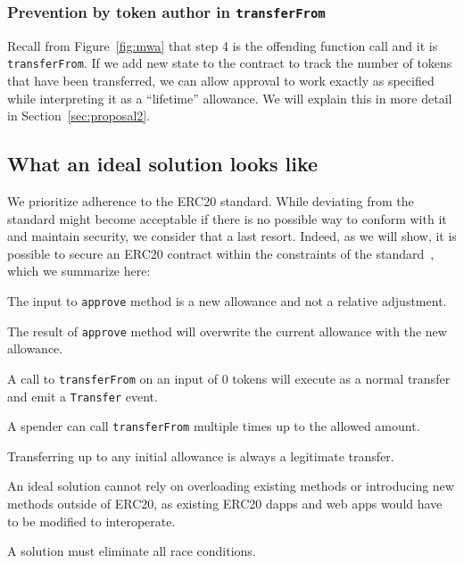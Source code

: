 \subsubsection*{Prevention by token author in \texttt{transferFrom}} Recall from Figure~\ref{fig:mwa} that step 4 is the offending function call and it is \texttt{transferFrom}. If we add new state to the contract to track the number of tokens that have been transferred, we can allow approval to work exactly as specified while interpreting it as a ``lifetime'' allowance. We will explain this in more detail in Section~\ref{sec:proposal2}. 

\subsection{What an ideal solution looks like}\label{sec:criteria}
We prioritize adherence to the ERC20 standard. While deviating from the standard might become acceptable if there is no possible way to conform with it and maintain security, we consider that a last resort. Indeed, as we will show, it is possible to secure an ERC20 contract within the constraints of the standard~\cite{Ref08}, which we summarize here:

\begin{compactlistn}
\item The input to \texttt{approve} method is a new allowance and not a relative adjustment.
\item The result of \texttt{approve} method will overwrite the current allowance with the new allowance.
\item A call to \texttt{transferFrom} on an input of 0 tokens will execute as a normal transfer and emit a \texttt{Transfer} event.
\item A spender can call \texttt{transferFrom} multiple times up to the allowed amount.
\item Transferring up to any initial allowance is always a legitimate transfer.
\item An ideal solution cannot rely on overloading existing methods or introducing new methods outside of ERC20, as existing ERC20 dapps and web apps would have to be modified to interoperate.
\item A solution must eliminate all race conditions.
\end{compactlistn}
